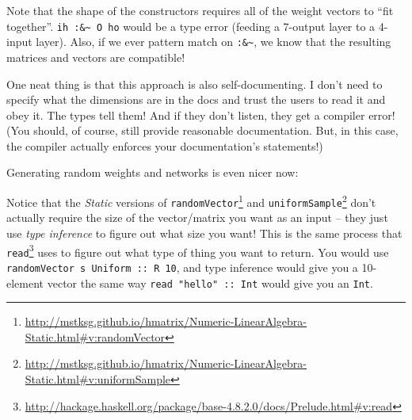 \documentclass[]{article}
\newenvironment{Shaded}{}{}
\newcommand{\CommentTok}[1]{\textcolor[rgb]{0.38,0.63,0.69}{\textit{#1}}}
\newcommand{\DataTypeTok}[1]{\textcolor[rgb]{0.56,0.13,0.00}{#1}}
\newcommand{\DecValTok}[1]{\textcolor[rgb]{0.25,0.63,0.44}{#1}}
\newcommand{\FunctionTok}[1]{\textcolor[rgb]{0.02,0.16,0.49}{#1}}
\newcommand{\KeywordTok}[1]{\textcolor[rgb]{0.00,0.44,0.13}{\textbf{#1}}}
\newcommand{\NormalTok}[1]{#1}
\newcommand{\OtherTok}[1]{\textcolor[rgb]{0.00,0.44,0.13}{#1}}
\renewcommand{\href}[2]{#2\footnote{\url{#1}}}
\begin{document}
Note that the shape of the constructors requires all of the weight vectors to
``fit together''. \texttt{ih\ :\&\textasciitilde{}\ O\ ho} would be a type error
(feeding a 7-output layer to a 4-input layer). Also, if we ever pattern match on
\texttt{:\&\textasciitilde{}}, we know that the resulting matrices and vectors
are compatible!

One neat thing is that this approach is also self-documenting. I don't need to
specify what the dimensions are in the docs and trust the users to read it and
obey it. The types tell them! And if they don't listen, they get a compiler
error! (You should, of course, still provide reasonable documentation. But, in
this case, the compiler actually enforces your documentation's statements!)

Generating random weights and networks is even nicer now:

\begin{Shaded}
\end{Shaded}

Notice that the \emph{Static} versions of
\href{http://mstksg.github.io/hmatrix/Numeric-LinearAlgebra-Static.html\#v:randomVector}{\texttt{randomVector}}
and
\href{http://mstksg.github.io/hmatrix/Numeric-LinearAlgebra-Static.html\#v:uniformSample}{\texttt{uniformSample}}
don't actually require the size of the vector/matrix you want as an input --
they just use \emph{type inference} to figure out what size you want! This is
the same process that
\href{http://hackage.haskell.org/package/base-4.8.2.0/docs/Prelude.html\#v:read}{\texttt{read}}
uses to figure out what type of thing you want to return. You would use
\texttt{randomVector\ s\ Uniform\ ::\ R\ 10}, and type inference would give you
a 10-element vector the same way \texttt{read\ "hello"\ ::\ Int} would give you
an \texttt{Int}.
\end{document}
